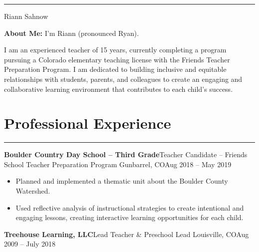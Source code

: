 \documentclass[letterpaper,10pt]{article}
\newcommand{\mblue}{\color{darkblue}}
\begin{document}
\pagestyle{empty}

{\mblue\rule{4.63in}{0.08cm}}

\vspace{-1.0pc}
\hfill{\Huge\mblue Riann Sahnow}

\vspace{2pc}

\textbf{About Me:} I'm Riann (pronounced Ryan).

\vspace{1pc}\qquad\qquad I am an experienced teacher of 15 years, currently completing a program pursuing a Colorado elementary teaching license with the Friends Teacher Preparation Program. I am dedicated to
building inclusive and equitable relationships with students, parents, and colleagues to create an engaging and collaborative learning environment that contributes to each child's
success.

\section*{\mblue Professional Experience}

\vspace{-2.15pc}
{\hfill\mblue\rule{4.615in}{0.02cm}}

\vspace{1pc}
\textbf{Boulder Country Day School -- Third Grade}\hfill Teacher Candidate -- Friends School Teacher Preparation Program
\smallbreak Gunbarrel, CO\hfill Aug 2018 -- May 2019

\begin{itemize}
    \item Planned and implemented a thematic unit about the Boulder County Watershed.
    \item Used reflective analysis of instructional strategies to create intentional and engaging lessons, creating interactive learning opportunities for each child.
\end{itemize}


\vspace{1pc}
\textbf{Treehouse Learning, LLC}\hfill Lead Teacher \& Preschool Lead
\smallbreak Louisville, CO\hfill Aug 2009 -- July 2018
\end{document}
